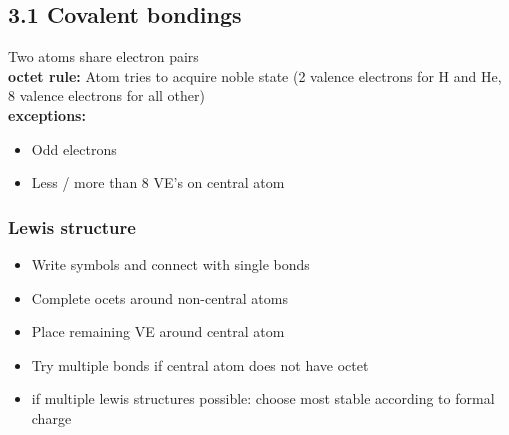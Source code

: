 \subsection{3.1 Covalent bondings}
    Two atoms share electron pairs\\
    \textbf{octet rule:} Atom tries to acquire noble state (2 valence electrons for H and He, 8 valence electrons for all other)\\
    \textbf{exceptions:} 
    \begin{itemize}
        \itemsep0em
        \item Odd electrons
        \item Less / more than 8 VE's on central atom
    \end{itemize}
\subsubsection{Lewis structure}
    \begin{itemize}
        \itemsep0em
        \item Write symbols and connect with single bonds
        \item Complete ocets around non-central atoms
        \item Place remaining VE around central atom
        \item Try multiple bonds if central atom does not have octet
        \item if multiple lewis structures possible: choose most stable according to formal charge
    \end{itemize}